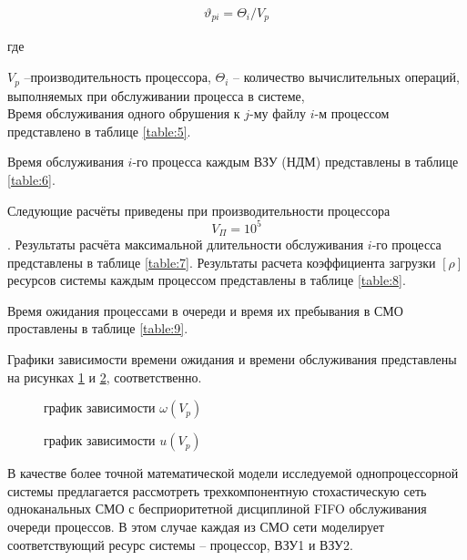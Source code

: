 \begin{align}
	\vartheta_{pi} =  \Theta_i/V_p
	\label{formul:3}
\end{align}

где 

$V_p$ --производительность процессора,
$\Theta_i$ -- количество вычислительных операций, выполняемых при обслуживании процесса в системе, \\

Время обслуживания одного обрушения к $j$-му файлу $i$-м процессом представлено в таблице \ref{table:5}.



Время обслуживания $i$-го процесса каждым ВЗУ (НДМ) представлены в таблице \ref{table:6}.



Следующие расчёты приведены при производительности процессора $$V_\Pi = 10^5$$. Результаты расчёта максимальной длительности обслуживания $i$-го процесса представлены в таблице \ref{table:7}. Результаты расчета коэффициента загрузки $[\rho]$ ресурсов системы каждым процессом представлены в таблице \ref{table:8}.





Время ожидания процессами в очереди и время их пребывания в СМО проставлены в таблице \ref{table:9}.



Графики зависимости времени ожидания и времени обслуживания представлены на рисунках \ref{img:1} и \ref{img:2}, соответственно.

\begin{figure}[H]
	\renewcommand{\figurename}{Рисунок}
	\caption{график зависимости $\omega(V_p)$}
	\label{img:1}
\end{figure}

\begin{figure}[H]
	\renewcommand{\figurename}{Рисунок}
	\caption{график зависимости $u(V_p)$}
	\label{img:2}
\end{figure}


В качестве более точной математической модели исследуемой однопроцессорной системы предлагается рассмотреть трехкомпонентную стохастическую сеть одноканальных СМО с бесприоритетной дисциплиной FIFO обслуживания очереди процессов.  В этом случае каждая из СМО сети моделирует соответствующий ресурс системы – процессор, ВЗУ1 и ВЗУ2.

